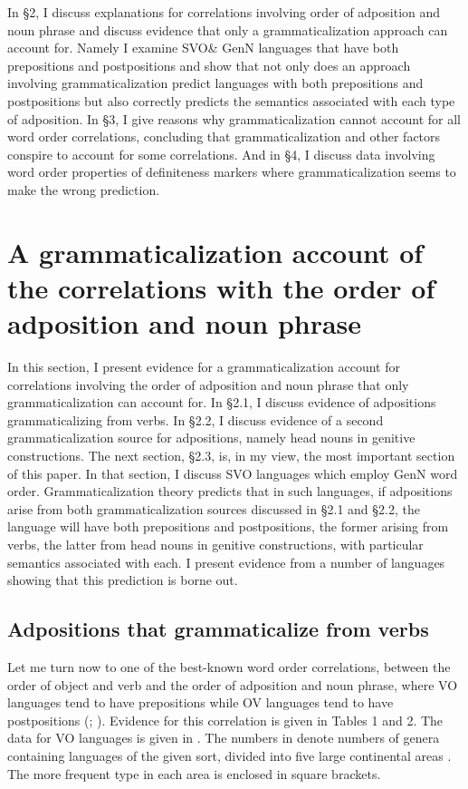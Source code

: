 \documentclass[output=paper]{langsci/langscibook}
\begin{document}
In §2, I discuss explanations for correlations involving order of adposition and noun phrase and discuss evidence that only a grammaticalization approach can account for. Namely I examine SVO\& GenN languages that have both prepositions and postpositions and show that not only does an approach involving grammaticalization predict languages with both prepositions and postpositions but also correctly predicts the semantics associated with each type of adposition. In §3, I give reasons why grammaticalization cannot account for all word order correlations, concluding that grammaticalization and other factors conspire to account for some correlations. And in §4, I discuss data involving word order properties of definiteness markers where grammaticalization seems to make the wrong prediction.

\section{A grammaticalization account of the correlations with the order of adposition and noun phrase} 

In this section, I present evidence for a grammaticalization account for correlations involving the order of adposition and noun phrase that only grammaticalization can account for. In §2.1, I discuss evidence of adpositions grammaticalizing from verbs. In §2.2, I discuss evidence of a second grammaticalization source for adpositions, namely head nouns in genitive constructions. The next section, §2.3, is, in my view, the most important section of this paper. In that section, I discuss SVO languages which employ GenN word order. Grammaticalization theory predicts that in such languages, if adpositions arise from both grammaticalization sources discussed in §2.1 and §2.2, the language will have both prepositions and postpositions, the former arising from verbs, the latter from head nouns in genitive constructions, with particular semantics associated with each. I present evidence from a number of languages showing that this prediction is borne out.

\subsection{Adpositions that grammaticalize from verbs}

Let me turn now to one of the best-known word order correlations, between the order of object and verb and the order of adposition and noun phrase, where VO languages tend to have prepositions while OV languages tend to have postpositions (\citealt{Greenberg1963}; \citealt{Dryer1992}). Evidence for this correlation is given in Tables 1 and 2. The data for VO languages is given in . The numbers in  denote numbers of genera containing languages of the given sort, divided into five large continental areas \citep{Dryer1989}. The more frequent type in each area is enclosed in square brackets.
\end{document}
